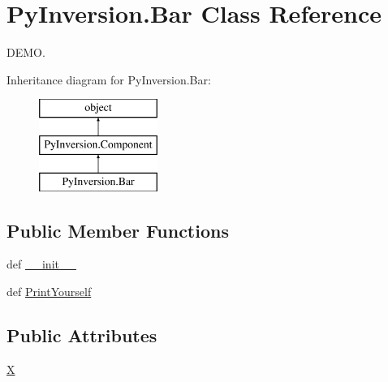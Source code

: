 \hypertarget{class_py_inversion_1_1_bar}{\section{Py\+Inversion.\+Bar Class Reference}
\label{class_py_inversion_1_1_bar}
}


D\+E\+M\+O.  


Inheritance diagram for Py\+Inversion.\+Bar\+:\begin{figure}[H]
\begin{center}
\leavevmode
\includegraphics[height=3.000000cm]{class_py_inversion_1_1_bar}
\end{center}
\end{figure}
\subsection*{Public Member Functions}
\begin{DoxyCompactItemize}
\item 
def \hyperlink{class_py_inversion_1_1_bar_a5260b893217bbc99f5a64093a58f3f2e}{\+\_\+\+\_\+init\+\_\+\+\_\+}
\item 
def \hyperlink{class_py_inversion_1_1_bar_a79ffcb7acf21e83f7ce3d60231adef36}{Print\+Yourself}
\end{DoxyCompactItemize}
\subsection*{Public Attributes}
\begin{DoxyCompactItemize}
\item 
\hyperlink{class_py_inversion_1_1_bar_a40572207d252c893b1e9b91005dd21b3}{X}
\end{DoxyCompactItemize}
